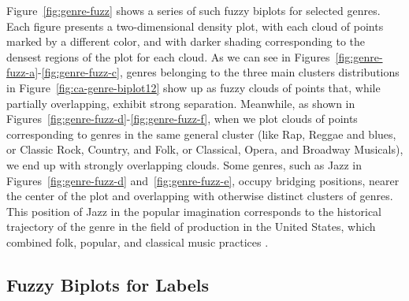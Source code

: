 \documentclass[12pt]{article}
\begin{document}
Figure~\ref{fig:genre-fuzz} shows a series of such fuzzy biplots for selected genres. Each figure presents a two-dimensional density plot, with each cloud of points marked by a different color, and with darker shading corresponding to the densest regions of the plot for each cloud. As we can see in Figures~\ref{fig:genre-fuzz-a}-\ref{fig:genre-fuzz-c}, genres belonging to the three main clusters distributions in Figure~\ref{fig:ca-genre-biplot12} show up as fuzzy clouds of points that, while partially overlapping, exhibit strong separation. Meanwhile, as shown in Figures~\ref{fig:genre-fuzz-d}-\ref{fig:genre-fuzz-f}, when we plot clouds of points corresponding to genres in the same general cluster (like Rap, Reggae and blues, or Classic Rock, Country, and Folk, or Classical, Opera, and Broadway Musicals), we end up with strongly overlapping clouds. Some genres, such as Jazz in Figures~\ref{fig:genre-fuzz-d} and~\ref{fig:genre-fuzz-e}, occupy bridging positions, nearer the center of the plot and overlapping with otherwise distinct clusters of genres. This position of Jazz in the popular imagination corresponds to the historical trajectory of the genre in the field of production in the United States, which combined folk, popular, and classical music practices \citep{lopes1999diffusion-1fa}.
\subsection*{Fuzzy Biplots for Labels}
\end{document}
